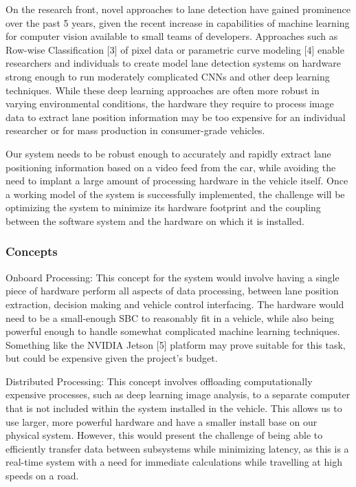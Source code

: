 \documentclass[titlepage]{article}
\begin{document}
On the research front, novel approaches to lane detection have gained prominence over the past 5 years, given the recent increase in capabilities of machine learning for computer vision available to small teams of developers. Approaches such as Row-wise Classification [3] of pixel data or parametric curve modeling [4] enable researchers and individuals to create model lane detection systems on hardware strong enough to run moderately complicated CNNs and other deep learning techniques. While these deep learning approaches are often more robust in varying environmental conditions, the hardware they require to process image data to extract lane position information may be too expensive for an individual researcher or for mass production in consumer-grade vehicles.

Our system needs to be robust enough to accurately and rapidly extract lane positioning information based on a video feed from the car, while avoiding the need to implant a large amount of processing hardware in the vehicle itself. Once a working model of the system is successfully implemented, the challenge will be optimizing the system to minimize its hardware footprint and the coupling between the software system and the hardware on which it is installed.

\subsubsection{Concepts}
Onboard Processing: This concept for the system would involve having a single piece of hardware perform all aspects of data processing, between lane position extraction, decision making and vehicle control interfacing. The hardware would need to be a small-enough SBC to reasonably fit in a vehicle, while also being powerful enough to handle somewhat complicated machine learning techniques. Something like the NVIDIA Jetson [5] platform may prove suitable for this task, but could be expensive given the project’s budget.

Distributed Processing: This concept involves offloading computationally expensive processes, such as deep learning image analysis, to a separate computer that is not included within the system installed in the vehicle. This allows us to use larger, more powerful hardware and have a smaller install base on our physical system. However, this would present the challenge of being able to efficiently transfer data between subsystems while minimizing latency, as this is a real-time system with a need for immediate calculations while travelling at high speeds on a road.
\end{document}
